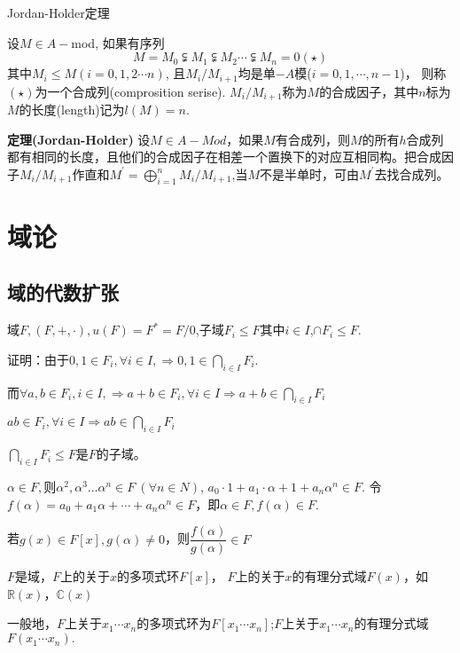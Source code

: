 \documentclass[UTF8]{article}
\begin{document}
\noindent Jordan-Holder定理

设$M\in A-$mod, 如果有序列
$$M=M_0\subsetneqq M_1\subsetneqq M_2\cdots\subsetneqq M_n=0(\star)$$
其中$M_i\leq M(i=0,1,2\cdots n)$,
且$M_i/M_{i+1}$均是单$-A$模($i=0,1,\cdots,n-1$)，
则称$(\star)$为一个合成列(comprosition serise).
$M_i/M_{i+1}$称为$M$的合成因子，其中$n$标为$M$的长度(length)记为$l(M)=n$.


\textbf{定理(Jordan-Holder)} 设$M\in A-Mod$，如果$M$有合成列，则$M$的所有$h$合成列都有相同的长度，且他们的合成因子在相差一个置换下的对应互相同构。把合成因子$M_{i}/M_{i+1}$作直和$M^{'}=\bigoplus\limits_{i=1}^nM_{i}/M_{i+1}$,当$M$不是半单时，可由$M^{'}$去找合成列。

\section{域论}

\subsection{域的代数扩张}

域$F,(F,+,\cdot),u(F)=F^{*}=F/{0}$,子域$F_{i}\leqslant F$其中$i\in I$,$\cap F_{i}\leqslant F.$


证明：由于$0,1 \in F_{i}, \forall i\in I, \Rightarrow 0,1\in \bigcap\limits_{i\in I}F_i$.

\hspace{11pt}而$\forall a, b \in F_{i}, i\in I, \Rightarrow a+b\in F_i, \forall i\in I\Rightarrow a+b\in\bigcap\limits_{i\in I}F_i$

\hspace{148pt}$ab\in F_i, \forall i\in I\Rightarrow ab\in\bigcap\limits_{i\in I}F_i$

\hspace{27pt} $\bigcap\limits_{i\in I}F_i\leqslant F$是$F$的子域。

$\alpha\in F,$则$\alpha^{2},\alpha^{3} \ldots \alpha^{n} \in F\ (\forall n\in N)$, $a_{0} \cdot 1+a_{1} \cdot \alpha+1+a_{n} \alpha^{n} \in F.$
令$f(\alpha)=a_{0}+a_{1} \alpha+\cdots+a_{n} \alpha^{n} \in F$，即$\alpha\in F, f(\alpha)\in F$.

若$g(x)\in F[x], g(\alpha)\neq 0$，则$\dfrac{f(\alpha)}{g(\alpha)} \in F$

$F$是域，$F$上的关于$x$的多项式环$F[x]$，
$F$上的关于$x$的有理分式域$F(x)$，如$\mathbb{R}(x)$，$\mathbb{C}(x)$

一般地，$F$上关于$x_{1} \cdots x_{n}$的多项式环为$F[x_{1} \cdots x_{n}]$;$F$上关于$x_{1} \cdots x_{n}$的有理分式域$F(x_{1} \cdots x_{n}).$\\
\end{document}
